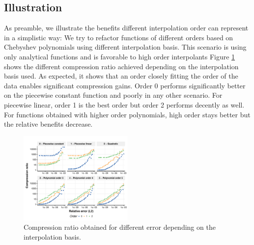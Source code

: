\documentclass[conference]{IEEEtran}
\theoremstyle{remark}
\begin{document}
\subsection{Illustration}
As preamble, we illustrate the benefits different interpolation order can represent in a simplistic way:
We try to refactor functions of different orders based on Chebyshev polynomials using different interpolation basis.
This scenario is using only analytical functions and is favorable to high order interpolants
Figure \ref{Fig:Illustration} shows the different compression ratio achieved depending on the interpolation basis used.
As expected, it shows that an order closely fitting the order of the data enables significant compression gains.
Order 0 performs significantly better on the piecewise constant function and poorly in any other scenario. For piecewise linear, order 1 is the best order but order 2 performs decently as well. For functions obtained with higher order polynomials, high order stays better but the relative benefits decrease. 

\begin{figure}[tbh!]
\centering
\includegraphics[width=0.5\textwidth]{Img/error_vs_size_order.pdf}
\caption{Compression ratio obtained for different error depending on the interpolation basis.}
\label{Fig:Illustration}
\end{figure}
\end{document}
